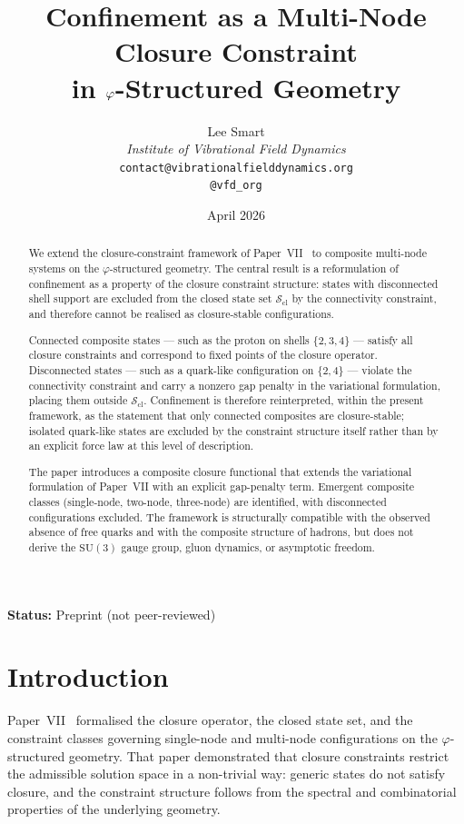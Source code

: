 \documentclass[12pt]{article}
\title{Confinement as a Multi-Node Closure Constraint\\in $\phig$-Structured Geometry}
\author{%
  Lee Smart\\[4pt]
  \textit{Institute of Vibrational Field Dynamics}\\[2pt]
  \texttt{contact@vibrationalfielddynamics.org}\\[2pt]
  \texttt{@vfd\_org}%
}
\date{April 2026}
\newcommand{\Scl}{\mathcal{S}_{\mathrm{cl}}}
\newcommand{\phig}{\varphi}
\begin{document}
\maketitle

\noindent\textbf{Status:} Preprint (not peer-reviewed)

\begin{abstract}
We extend the closure-constraint framework of Paper~VII~\citep{SmartVII} to composite multi-node systems on the $\phig$-structured geometry. The central result is a reformulation of confinement as a property of the closure constraint structure: states with disconnected shell support are excluded from the closed state set $\Scl$ by the connectivity constraint, and therefore cannot be realised as closure-stable configurations.

Connected composite states --- such as the proton on shells $\{2,3,4\}$ --- satisfy all closure constraints and correspond to fixed points of the closure operator. Disconnected states --- such as a quark-like configuration on $\{2,4\}$ --- violate the connectivity constraint and carry a nonzero gap penalty in the variational formulation, placing them outside $\Scl$. Confinement is therefore reinterpreted, within the present framework, as the statement that only connected composites are closure-stable; isolated quark-like states are excluded by the constraint structure itself rather than by an explicit force law at this level of description.

The paper introduces a composite closure functional that extends the variational formulation of Paper~VII with an explicit gap-penalty term. Emergent composite classes (single-node, two-node, three-node) are identified, with disconnected configurations excluded. The framework is structurally compatible with the observed absence of free quarks and with the composite structure of hadrons, but does not derive the $\mathrm{SU}(3)$ gauge group, gluon dynamics, or asymptotic freedom.
\end{abstract}

\section{Introduction}\label{sec:intro}

Paper~VII~\citep{SmartVII} formalised the closure operator, the closed state set, and the constraint classes governing single-node and multi-node configurations on the $\phig$-structured geometry. That paper demonstrated that closure constraints restrict the admissible solution space in a non-trivial way: generic states do not satisfy closure, and the constraint structure follows from the spectral and combinatorial properties of the underlying geometry.
\end{document}
